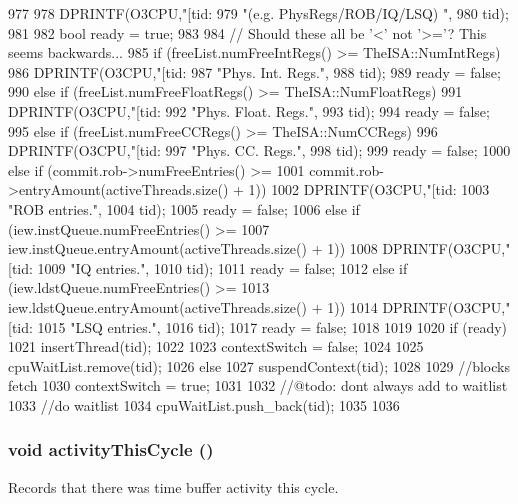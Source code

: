 \begin{DoxyCode}
977 {
978     DPRINTF(O3CPU,"[tid:%
979             "(e.g. PhysRegs/ROB/IQ/LSQ) \n",
980             tid);
981 
982     bool ready = true;
983 
984     // Should these all be '<' not '>='?  This seems backwards...
985     if (freeList.numFreeIntRegs() >= TheISA::NumIntRegs) {
986         DPRINTF(O3CPU,"[tid:%
987                 "Phys. Int. Regs.\n",
988                 tid);
989         ready = false;
990     } else if (freeList.numFreeFloatRegs() >= TheISA::NumFloatRegs) {
991         DPRINTF(O3CPU,"[tid:%
992                 "Phys. Float. Regs.\n",
993                 tid);
994         ready = false;
995     } else if (freeList.numFreeCCRegs() >= TheISA::NumCCRegs) {
996         DPRINTF(O3CPU,"[tid:%
997                 "Phys. CC. Regs.\n",
998                 tid);
999         ready = false;
1000     } else if (commit.rob->numFreeEntries() >=
1001                commit.rob->entryAmount(activeThreads.size() + 1)) {
1002         DPRINTF(O3CPU,"[tid:%
1003                 "ROB entries.\n",
1004                 tid);
1005         ready = false;
1006     } else if (iew.instQueue.numFreeEntries() >=
1007                iew.instQueue.entryAmount(activeThreads.size() + 1)) {
1008         DPRINTF(O3CPU,"[tid:%
1009                 "IQ entries.\n",
1010                 tid);
1011         ready = false;
1012     } else if (iew.ldstQueue.numFreeEntries() >=
1013                iew.ldstQueue.entryAmount(activeThreads.size() + 1)) {
1014         DPRINTF(O3CPU,"[tid:%
1015                 "LSQ entries.\n",
1016                 tid);
1017         ready = false;
1018     }
1019 
1020     if (ready) {
1021         insertThread(tid);
1022 
1023         contextSwitch = false;
1024 
1025         cpuWaitList.remove(tid);
1026     } else {
1027         suspendContext(tid);
1028 
1029         //blocks fetch
1030         contextSwitch = true;
1031 
1032         //@todo: dont always add to waitlist
1033         //do waitlist
1034         cpuWaitList.push_back(tid);
1035     }
1036 }
\end{DoxyCode}
\hypertarget{classFullO3CPU_ad7e5c2506873e8dc8c71740ac6dabb23}{
\subsubsection[{activityThisCycle}]{\setlength{\rightskip}{0pt plus 5cm}void activityThisCycle ()}}
\label{classFullO3CPU_ad7e5c2506873e8dc8c71740ac6dabb23}
Records that there was time buffer activity this cycle. 


